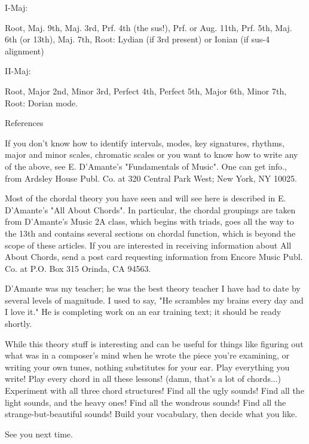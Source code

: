 I-Maj:

Root, Maj. 9th, Maj. 3rd, Prf. 4th (the sus!), Prf. or Aug. 11th,
Prf. 5th, Maj. 6th (or 13th), Maj. 7th, Root:
Lydian (if 3rd present) or Ionian (if sus-4 alignment)

II-Maj:

Root, Major 2nd, Minor 3rd, Perfect 4th, Perfect 5th,
Major 6th, Minor 7th, Root:
Dorian mode.

References

If you don't know how to identify intervals, modes, key signatures,
rhythms, major and minor scales, chromatic scales or you want to know
how to write any of the above, see E. D'Amante's "Fundamentals of Music".
One can get info., from Ardsley House Publ. Co. at 320 Central Park West;
New York, NY 10025.

Most of the chordal theory you have seen and will see here is described 
in E. D'Amante's "All About Chords". In particular, the chordal groupings
are taken from D'Amante's Music 2A class, which begins with triads, goes
all the way to the 13th and contains several sections on chordal function,
which is beyond the scope of these articles. If you are interested in
receiving information about All About Chords, send a post card requesting
information from Encore Music Publ. Co. at P.O. Box 315 Orinda, CA 94563.

D'Amante was my teacher; he was the best theory teacher I have had to
date by several levels of magnitude. I used to say, "He scrambles my
brains every day and I love it." He is completing work on an ear training
text; it should be ready shortly.

While this theory stuff is interesting and can be useful for things like
figuring out what was in a composer's mind when he wrote the piece you're
examining, or writing your own tunes, nothing substitutes for your ear.
Play everything you write! Play every chord in all these lessons! (damn,
that's a lot of chords...) Experiment with all three chord structures!
Find all the ugly sounds! Find all the light sounds, and the heavy ones!
Find all the wondrous sounds! Find all the strange-but-beautiful sounds!
Build your vocabulary, then decide what you like.

See you next time.

